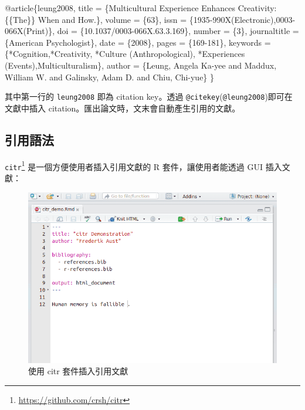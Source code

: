 \documentclass[oneside]{book}
\newenvironment{Shaded}{\begin{snugshade}}{\end{snugshade}}
\newcommand{\DataTypeTok}[1]{\textcolor[rgb]{0.13,0.29,0.53}{#1}}
\newcommand{\NormalTok}[1]{#1}
\newcommand{\OtherTok}[1]{\textcolor[rgb]{0.56,0.35,0.01}{#1}}
\newcommand{\VariableTok}[1]{\textcolor[rgb]{0.00,0.00,0.00}{#1}}
\renewcommand{\href}[2]{#2\footnote{\url{#1}}}
\theoremstyle{definition}
\theoremstyle{definition}
\theoremstyle{definition}
\theoremstyle{remark}
\begin{document}
\begin{Shaded}
\begin{Highlighting}[]
\VariableTok{@article}\NormalTok{\{}\OtherTok{leung2008}\NormalTok{,}
  \DataTypeTok{title}\NormalTok{ = \{Multicultural Experience Enhances Creativity: \{\{The\}\} When and How.\},}
  \DataTypeTok{volume}\NormalTok{ = \{63\},}
  \DataTypeTok{issn}\NormalTok{ = \{1935-990X(Electronic),0003-066X(Print)\},}
  \DataTypeTok{doi}\NormalTok{ = \{10.1037/0003-066X.63.3.169\},}
  \DataTypeTok{number}\NormalTok{ = \{3\},}
  \DataTypeTok{journaltitle}\NormalTok{ = \{American Psychologist\},}
  \DataTypeTok{date}\NormalTok{ = \{2008\},}
  \DataTypeTok{pages}\NormalTok{ = \{169-181\},}
  \DataTypeTok{keywords}\NormalTok{ = \{*Cognition,*Creativity,}
\NormalTok{    *Culture (Anthropological),}
\NormalTok{    *Experiences (Events),Multiculturalism\},}
  \DataTypeTok{author}\NormalTok{ = \{Leung, Angela Ka-yee and }
\NormalTok{    Maddux, William W. and }
\NormalTok{    Galinsky, Adam D. and Chiu, Chi-yue\}}
\NormalTok{\}}
\end{Highlighting}
\end{Shaded}

其中第一行的 \texttt{leung2008} 即為 citation key。透過 \texttt{@citekey}(\texttt{@leung2008})即可在文獻中插入 citation。匯出論文時，文末會自動產生引用的文獻。

\hypertarget{cite-syntax}{%
\subsection{引用語法}\label{cite-syntax}}

\href{https://github.com/crsh/citr}{\texttt{citr}} 是一個方便使用者插入引用文獻的 R 套件，讓使用者能透過 GUI 插入文獻：

\begin{figure}

{\centering \includegraphics[width=1\linewidth]{figs/citr} 

}

\caption{使用 citr 套件插入引用文獻}\label{fig:unnamed-chunk-4}
\end{figure}
\end{document}
